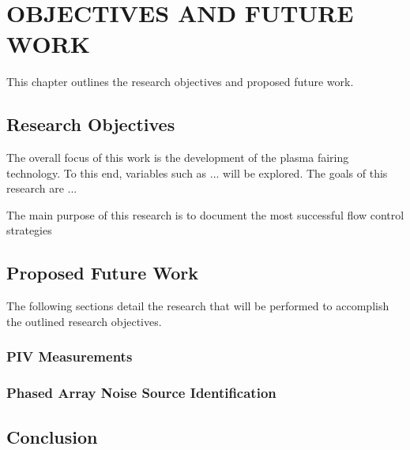 %
%

\chapter{OBJECTIVES AND FUTURE WORK}
This chapter outlines the research objectives and proposed future work. 

\section{Research Objectives}
The overall focus of this work is the development of the plasma fairing technology. To this end, variables such as ... will be explored. The goals of this research are ...

The main purpose of this research is to document the most successful flow control strategies 

\section{Proposed Future Work}
The following sections detail the research that will be performed to accomplish the outlined research objectives.

\subsection{PIV Measurements}

\subsection{Phased Array Noise Source Identification}

\section{Conclusion}
